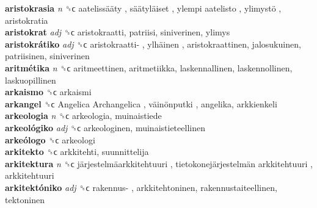 \textbf{aristokrasia} \emph{n}  ␝ϲ   aatelissääty ,  säätyläiset ,  ylempi aatelisto ,  ylimystö , aristokratia  \\
\textbf{aristokrat} \emph{adj}  ␝ϲ  aristokraatti, patriisi, siniverinen, ylimys  \\
\textbf{aristokrátiko} \emph{adj}  ␝ϲ   aristokraatti- ,  ylhäinen , aristokraattinen, jalosukuinen, patriisinen, siniverinen  \\
\textbf{aritmétika} \emph{n}  ␝ϲ  aritmeettinen, aritmetiikka, laskennallinen, laskennollinen, laskuopillinen  \\
\textbf{arkaismo} ␝ϲ  arkaismi  \\
\textbf{arkangel} ␝ϲ   Angelica Archangelica ,  väinönputki , angelika, arkkienkeli  \\
\textbf{arkeologia} \emph{n}  ␝ϲ  arkeologia, muinaistiede  \\
\textbf{arkeológiko} \emph{adj}  ␝ϲ  arkeologinen, muinaistieteellinen  \\
\textbf{arkeólogo} ␝ϲ  arkeologi  \\
\textbf{arkitekto} ␝ϲ  arkkitehti, suunnittelija  \\
\textbf{arkitektura} \emph{n}  ␝ϲ   järjestelmäarkkitehtuuri ,  tietokonejärjestelmän arkkitehtuuri , arkkitehtuuri  \\
\textbf{arkitektóniko} \emph{adj}  ␝ϲ   rakennus- , arkkitehtoninen, rakennustaiteellinen, tektoninen  \\

